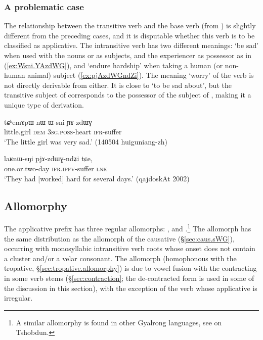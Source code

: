 \subsubsection{A problematic case} \label{sec:nWzdWG}
The relationship between the transitive verb   and the base verb  (from ) is slightly different from the preceding cases, and it is disputable whether this verb is to be classified as applicative. The intransitive verb  has two different meanings: `be sad' when used with the nouns  or  as subjects, and the experiencer as possessor as in (\ref{ex:Wsni.YAzdWG}), and `endure hardship' when taking a human (or non-human animal) subject (\ref{ex:pjAzdWGndZi}). The meaning `worry' of the verb  is not directly derivable from either. It is close to `to be sad about', but the transitive subject of  corresponds to the possessor of the subject of , making it a unique type of derivation.

\begin{exe}
\ex \label{ex:Wsni.YAzdWG}
\gll  tɕʰemɤpɯ nɯ ɯ-sni ɲɤ-zdɯɣ \\
little.girl \textsc{dem} \textsc{3sg}.\textsc{poss}-heart \textsc{ifr}-suffer \\
\glt `The little girl was very sad.' (140504 huiguniang-zh)
\end{exe}

\begin{exe}
\ex \label{ex:pjAzdWGndZi}
\gll  laʁnɯ-sŋi pjɤ-zdɯɣ-ndʑi tɕe, \\
one.or.two-day \textsc{ifr}.\textsc{ipfv}-suffer \textsc{lnk} \\
\glt `They had [worked] hard for several days.' (qajdoskAt 2002) 
\end{exe}


\subsection{Allomorphy} \label{sec:allomorphy.applicative}
 
The applicative prefix has three regular allomorphs: ,  and .\footnote{A similar allomorphy is found in other Gyalrong languages, see \citet{jackson06paisheng} on Tshobdun.} The allomorph  has the same distribution as the  allomorph of the causative (§\ref{sec:caus.sWG}), occurring with monosyllabic intransitive verb roots whose onset does not contain a cluster and/or a velar consonant. The allomorph  (homophonous with the tropative, §\ref{sec:tropative.allomorphy}) is due to vowel fusion with the contracting  in some verb stems (§\ref{sec:contraction}; the de-contracted form  is used in some of the discussion in this section), with the exception of the verb  whose applicative is irregular. 

